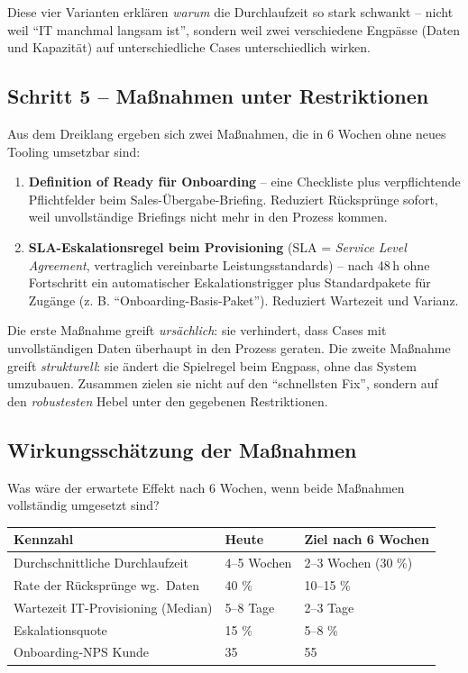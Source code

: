\documentclass[11pt,a4paper,oneside]{article}
\newcommand{\fachbegriff}[1]{\textbf{#1}}
\begin{document}
Diese vier Varianten erklären \emph{warum} die Durchlaufzeit so stark schwankt -- nicht weil ``IT manchmal langsam ist'', sondern weil zwei verschiedene Engpässe (Daten und Kapazität) auf unterschiedliche Cases unterschiedlich wirken.

\subsection{Schritt 5 -- Maßnahmen unter Restriktionen}

Aus dem Dreiklang ergeben sich zwei Maßnahmen, die in 6 Wochen ohne neues Tooling umsetzbar sind:

\begin{enumerate}
  \item \fachbegriff{Definition of Ready für Onboarding} -- eine Checkliste plus verpflichtende Pflichtfelder beim Sales-Übergabe-Briefing. Reduziert Rücksprünge sofort, weil unvollständige Briefings nicht mehr in den Prozess kommen.
  \item \fachbegriff{SLA-Eskalations\-regel beim Provisioning} (SLA = \emph{Service Level Agreement}, vertraglich vereinbarte Leistungsstandards) -- nach 48\,h ohne Fortschritt ein automatischer Eskalationstrigger plus Standardpakete für Zugänge (z. B. ``Onboarding-Basis-Paket''). Reduziert Wartezeit und Varianz.
\end{enumerate}

\begin{merkbox}
Die erste Maßnahme greift \emph{ursächlich}: sie verhindert, dass Cases mit unvollständigen Daten überhaupt in den Prozess geraten. Die zweite Maßnahme greift \emph{strukturell}: sie ändert die Spielregel beim Engpass, ohne das System umzubauen. Zusammen zielen sie nicht auf den ``schnellsten Fix'', sondern auf den \emph{robustesten} Hebel unter den gegebenen Restriktionen.
\end{merkbox}

\subsection{Wirkungsschätzung der Maßnahmen}

Was wäre der erwartete Effekt nach 6 Wochen, wenn beide Maßnahmen vollständig umgesetzt sind?

\begin{tabularx}{\linewidth}{@{}lXX@{}}
\toprule
\textbf{Kennzahl}                  & \textbf{Heute}     & \textbf{Ziel nach 6 Wochen} \\
\midrule
Durchschnittliche Durchlaufzeit   & 4--5 Wochen        & 2--3 Wochen (\textminus{}30 \%) \\
Rate der Rücksprünge wg.\ Daten   & 40 \%              & 10--15 \% \\
Wartezeit IT-Provisioning (Median) & 5--8 Tage          & 2--3 Tage \\
Eskalationsquote                   & 15 \%              & 5--8 \% \\
Onboarding-NPS Kunde               & 35                 & 55 \\
\bottomrule
\end{tabularx}
\end{document}
